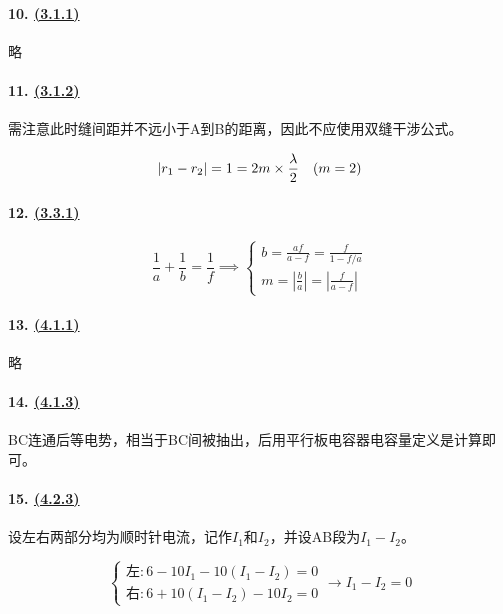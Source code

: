 \paragraph{10. \hyperref[subsec:3.1.1]{(3.1.1)}} 略
\paragraph{11. \hyperref[subsec:3.1.2]{(3.1.2)}} 需注意此时缝间距并不远小于A到B的距离，因此不应使用双缝干涉公式。

\begin{equation*}
    |r_1-r_2|=1=2m\times\frac\lambda2\quad(m=2)\\
\end{equation*}

\paragraph{12. \hyperref[subsec:3.3.1]{(3.3.1)}}

\begin{equation*}
    \frac1a+\frac1b=\frac1f\implies
    \begin{cases}
        b=\frac{af}{a-f}=\frac{f}{1-f/a}\\
        m=\left|\frac{b}{a}\right|=\left|\frac{f}{a-f}\right|
    \end{cases}
\end{equation*}

\paragraph{13. \hyperref[subsec:4.1.1]{(4.1.1)}} 略
\paragraph{14. \hyperref[subsec:4.1.3]{(4.1.3)}} BC连通后等电势，相当于BC间被抽出，后用平行板电容器电容量定义是计算即可。

\paragraph{15. \hyperref[subsec:4.2.3]{(4.2.3)}} 设左右两部分均为顺时针电流，记作$I_1$和$I_2$，并设AB段为$I_1-I_2$。

\begin{equation*}
    \begin{cases}
        \textrm{左}: 6-10I_1-10(I_1-I_2)=0\\
        \textrm{右}: 6+10(I_1-I_2)-10I_2=0
    \end{cases}\to
    I_1-I_2=0
\end{equation*}

